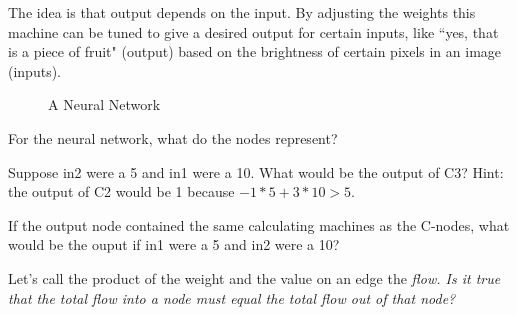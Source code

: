 The idea is that output depends on the input. By adjusting the weights this machine can be tuned to give a desired output for certain  inputs, like ``yes, that is a piece of fruit" (output) based on the brightness of certain pixels in an image (inputs).
\begin{figure}[H]
\begin{center}
\caption{A Neural Network}
\label{F:1NN}
\end{center}
\end{figure}

\begin{alevel}
For the neural network, what do the nodes represent?
\end{alevel}

\begin{blevel}
Suppose in2 were a 5 and in1 were a 10. What would be the output of C3? Hint: the output of C2 would be 1 because $-1*5+3*10 > 5$.
\end{blevel}

\begin{clevel}
If the output node contained the same calculating machines as the C-nodes, what would be the ouput if in1 were a 5 and in2 were a 10? 
\end{clevel}

\begin{clevel}
Let's call the product of the weight and the value on an edge the \em{flow}. Is it true that the total flow into a node must equal the total flow out of that node? 
\end{clevel}


